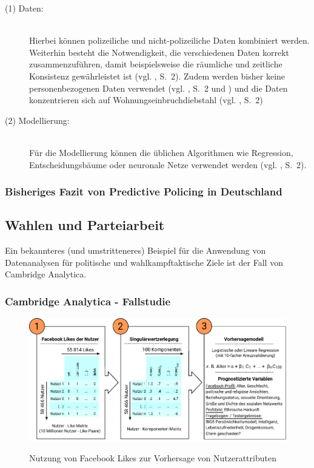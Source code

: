 \begin{description}

\item[(1) Daten:] \hfill \\
Hierbei können polizeiliche und nicht-polizeiliche Daten kombiniert werden. Weiterhin
besteht die Notwendigkeit, die verschiedenen Daten korrekt zusammenzuführen, damit beispielsweise die räumliche
und zeitliche Konsistenz gewährleistet ist (vgl. \cite{Bode}, S.~2). Zudem werden bisher keine
personenbezogenen Daten verwendet (vgl. \cite{Bode}, S.~2 und \cite{Heuberger}) und die Daten konzentrieren
sich auf Wohnungseinbruchdiebstahl (vgl. \cite{Bode}, S.~2)

\item[(2) Modellierung:] \hfill \\
Für die Modellierung können die üblichen Algorithmen wie Regression, Entscheidungsbäume oder
neuronale Netze verwendet werden (vgl. \cite{Bode}, S.~2).

\end{description}



\subsubsection{Bisheriges Fazit von Predictive Policing in Deutschland}

\subsection{Wahlen und Parteiarbeit}

Ein bekannteres (und umstritteneres) Beispiel für die Anwendung von Datenanalysen
für politische und wahlkampftaktische Ziele ist der Fall von Cambridge Analytica.

\subsubsection{Cambridge Analytica - Fallstudie}

\begin{figure}%
\centering
\caption{Nutzung von Facebook Likes zur Vorhersage von Nutzerattributen}
\includegraphics[scale=1.0]{Grafiken/Facebook_Likes_Ink.pdf} 
\label{pic:Like_Matrix}
\end{figure}

